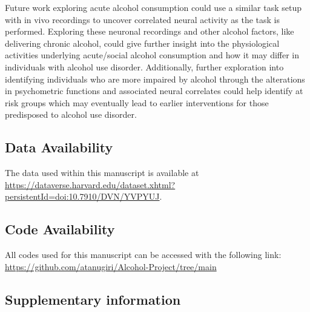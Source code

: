 \documentclass{article}
\begin{document}
\vspace{1em}

Future work exploring acute alcohol consumption could use a similar task setup with in vivo recordings to uncover correlated neural activity as the task is performed. Exploring these neuronal recordings and other alcohol factors, like delivering chronic alcohol, could give further insight into the physiological activities underlying acute/social alcohol consumption and how it may differ in individuals with alcohol use disorder. Additionally, further exploration into identifying individuals who are more impaired by alcohol through the alterations in psychometric functions and associated neural correlates could help identify at risk groups which may eventually lead to earlier interventions for those predisposed to alcohol use disorder.

\clearpage

\subsection{Data Availability}

The data used within this manuscript is available at \url{https://dataverse.harvard.edu/dataset.xhtml?persistentId=doi:10.7910/DVN/YVPYUJ}.

\subsection{Code Availability}
All codes used for this manuscript can be accessed with the following link:\\
\url{https://github.com/atanugiri/Alcohol-Project/tree/main}

\clearpage

\subsection{Supplementary information}
\end{document}

